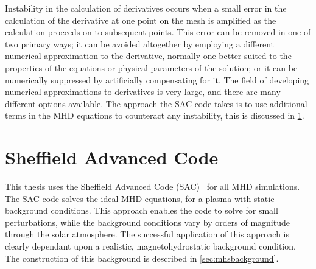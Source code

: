 Instability in the calculation of derivatives occurs when a small error in the calculation of the derivative at one point on the mesh is amplified as the calculation proceeds on to subsequent points.
This error can be removed in one of two primary ways; it can be avoided altogether by employing a different numerical approximation to the derivative, normally one better suited to the properties of the equations or physical parameters of the solution; or it can be numerically suppressed by artificially compensating for it.
The field of developing numerical approximations to derivatives is very large, and there are many different options available.
The approach the SAC code takes is to use additional terms in the MHD equations to counteract any instability, this is discussed in \cref{sec:SAC}.


\section{Sheffield Advanced Code}\label{sec:SAC}

This thesis uses the Sheffield Advanced Code (SAC)~\citep{shelyag2008} for all MHD simulations.
The SAC code solves the ideal MHD equations, for a plasma with static background conditions.
This approach enables the code to solve for small perturbations, while the background conditions vary by orders of magnitude through the solar atmosphere.
The successful application of this approach is clearly dependant upon a realistic, magnetohydrostatic background condition.
The construction of this background is described in \cref{sec:mhsbackground}.

